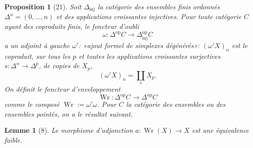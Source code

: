 \documentclass[11pt]{article}
\theoremstyle{deligne}
\newtheorem*{proposition*}{Proposition}
\newtheorem*{lemma*}{Lemme}
\newcommand{\Wr}{\operatorname{Wr}}
\newcommand{\inj}{\mathrm{inj}}
\newcommand{\op}{\mathrm{op}}
\begin{document}
\begin{proposition*}[21]
Soit \(\Delta_{\inj}\) la catégorie des ensembles finis ordonnés \(\Delta^n=(0,\ldots,n)\) et des applications croissantes injectives. Pour toute catégorie \(C\) ayant des coproduits finis, le foncteur d'oubli
\[
\omega:\Delta^{\op}C\longrightarrow \Delta^{\op}_{\inj}C
\]
a un adjoint à gauche \(\omega'\): «ajout formel de simplexes dégénérés»: \((\omega'X)_n\) est le coproduit, sur tous les \(p\) et toutes les applications croissantes surjectives \(s:\Delta^n\to\Delta^p\), de copies de \(X_p\),
\[
(\omega'X)_n=\coprod_s X_p.
\]
On définit le foncteur d'enveloppement
\[
\Wr:\Delta^{\op}C\longrightarrow\Delta^{\op}C
\]
comme le composé \(\Wr:=\omega'\omega\). Pour \(C\) la catégorie des ensembles ou des ensembles pointés, on a le résultat suivant.
\end{proposition*}

\begin{lemma*}[8]
Le morphisme d'adjonction \(a:\Wr(X)\to X\) est une équivalence faible.
\end{lemma*}
\end{document}
